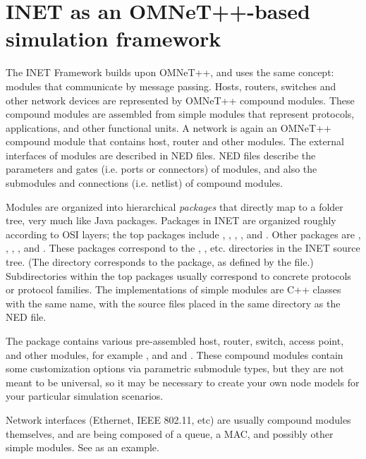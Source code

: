 \section{INET as an OMNeT++-based simulation framework}

The INET Framework builds upon OMNeT++, and uses the same concept: modules
that communicate by message passing. Hosts, routers, switches and other
network devices are represented by OMNeT++ compound modules. These compound
modules are assembled from simple modules that represent protocols,
applications, and other functional units. A network is again an OMNeT++
compound module that contains host, router and other modules. The external
interfaces of modules are described in NED files. NED files describe the
parameters and gates (i.e. ports or connectors) of modules, and also the
submodules and connections (i.e. netlist) of compound modules.

Modules are organized into hierarchical \textit{packages} that directly map to
a folder tree, very much like Java packages. Packages in
INET are organized roughly according to OSI layers; the top packages
include , ,
, , and . 
Other packages are , , , 
, and . These packages correspond to the
, , etc. directories in the
INET source tree. (The  directory corresponds to the  
package, as defined by the  file.) Subdirectories
within the top packages usually correspond to concrete protocols or protocol
families. The implementations of simple modules are C++ classes with the same
name, with the source files placed in the same directory as the NED file.

The  package contains various pre-assembled host, router,
switch, access point, and other modules, for example
,  and  and
. These compound modules contain some customization
options via parametric submodule types, but they are not meant to be
universal, so it may be necessary to create your own node models for
your particular simulation scenarios.

Network interfaces (Ethernet, IEEE 802.11, etc) are usually compound modules
themselves, and are being composed of a queue, a MAC, and possibly other
simple modules. See  as an example.

